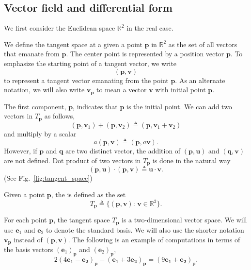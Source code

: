 \subsection{Vector field and differential form}
\label{sec:tangent_space}
We first consider the Euclidean space $\mathbb{R}^2$ in the real case.

We define the tangent space at a given a point $\mathbf{p}$ in $\mathbb{R}^2$ as the set of all vectors that emanate from $\mathbf{p}$. The center point is represented by a position vector $\mathbf{p}$. To emphasize the starting point of a tangent vector, we write
$$
(\mathbf{p}, \mathbf{v})
$$
to represent a tangent vector emanating from the point $\mathbf{p}$. As an alternate notation, we will also write $\mathbf{v}_\mathbf{p}$ to mean a vector $\mathbf{v}$ with initial point $\mathbf{p}$.





The first component, $\mathbf{p}$, indicates that $\mathbf{p}$ is the initial point. We can add two vectors in $T_\mathbf{p}$ as follows,
$$
(\mathbf{p}, \mathbf{v}_1) + (\mathbf{p}, \mathbf{v}_2) \triangleq (\mathbf{p}, \mathbf{v}_1 + \mathbf{v}_2 )  
$$
and multiply by a scalar
$$
a(\mathbf{p}, \mathbf{v}) \triangleq (\mathbf{p}, a\mathbf{v}).
$$
However, if $\mathbf{p}$ and $\mathbf{q}$ are two distinct vector, the addition of $(\mathbf{p}, \mathbf{u})$ and $(\mathbf{q}, \mathbf{v})$ are not defined. Dot product of two vectors in $T_\mathbf{p}$ is done in the natural way
\begin{equation}
	(\mathbf{p}, \mathbf{u}) \cdot  (\mathbf{p}, \mathbf{v})  \triangleq
	 \mathbf{u} \cdot \mathbf{v}.
	\label{def:tangent_vector_dot_product}
\end{equation} (See Fig.~\ref{fig:tangent_space})

\begin{svgraybox}
	\begin{definition} 
		Given a point $\mathbf{p}$, the  is defined as the set
		$$
		T_\mathbf{p} \triangleq \{ (\mathbf{p}, \mathbf{v}):\, \mathbf{v} \in\mathbb{R}^2 \}.
		$$ 
	\end{definition}
\end{svgraybox}

For each point $\mathbf{p}$, the tangent space $T_\mathbf{p}$ is a two-dimensional vector space. We will use $\mathbf{e}_1$ and $\mathbf{e}_2$ to denote the standard basis. We will also use the shorter notation $\mathbf{v}_\mathbf{p}$ instead of $(\mathbf{p},\mathbf{v})$. The following is an example of computations in terms of the basis vectors $(\mathbf{e}_1)_\mathbf{p}$ and $(\mathbf{e}_2)_\mathbf{p}$,
$$
2 (4\mathbf{e_1}-\mathbf{e_2})_\mathbf{p} + (\mathbf{e_1}+ 3 \mathbf{e_2})_\mathbf{p} =(9\mathbf{e_1}+ \mathbf{e_2})_\mathbf{p}.
$$



